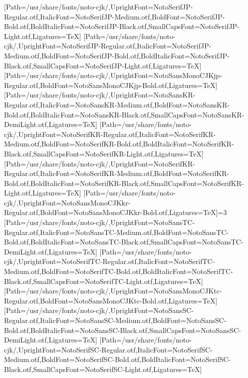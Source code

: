 \newfontfamily{}[Path=/usr/share/fonts/noto-cjk/,UprightFont=NotoSerifJP-Regular.otf,ItalicFont=NotoSerifJP-Medium.otf,BoldFont=NotoSerifJP-Bold.otf,BoldItalicFont=NotoSerifJP-Black.otf,SmallCapsFont=NotoSerifJP-Light.otf,Ligatures=TeX]
\newfontfamily{}[Path=/usr/share/fonts/noto-cjk/,UprightFont=NotoSerifJP-Regular.otf,ItalicFont=NotoSerifJP-Medium.otf,BoldFont=NotoSerifJP-Bold.otf,BoldItalicFont=NotoSerifJP-Black.otf,SmallCapsFont=NotoSerifJP-Light.otf,Ligatures=TeX]
\newfontfamily{}[Path=/usr/share/fonts/noto-cjk/,UprightFont=NotoSansMonoCJKjp-Regular.otf,BoldFont=NotoSansMonoCJKjp-Bold.otf,Ligatures=TeX]
\newfontfamily{}[Path=/usr/share/fonts/noto-cjk/,UprightFont=NotoSansKR-Regular.otf,ItalicFont=NotoSansKR-Medium.otf,BoldFont=NotoSansKR-Bold.otf,BoldItalicFont=NotoSansKR-Black.otf,SmallCapsFont=NotoSansKR-DemiLight.otf,Ligatures=TeX]
\newfontfamily{}[Path=/usr/share/fonts/noto-cjk/,UprightFont=NotoSerifKR-Regular.otf,ItalicFont=NotoSerifKR-Medium.otf,BoldFont=NotoSerifKR-Bold.otf,BoldItalicFont=NotoSerifKR-Black.otf,SmallCapsFont=NotoSerifKR-Light.otf,Ligatures=TeX]
\newfontfamily{}[Path=/usr/share/fonts/noto-cjk/,UprightFont=NotoSerifKR-Regular.otf,ItalicFont=NotoSerifKR-Medium.otf,BoldFont=NotoSerifKR-Bold.otf,BoldItalicFont=NotoSerifKR-Black.otf,SmallCapsFont=NotoSerifKR-Light.otf,Ligatures=TeX]
\newfontfamily{}[Path=/usr/share/fonts/noto-cjk/,UprightFont=NotoSansMonoCJKkr-Regular.otf,BoldFont=NotoSansMonoCJKkr-Bold.otf,Ligatures=TeX]\else\ifnum\value{NotoCJKFamily}=3
\newfontfamily{}[Path=/usr/share/fonts/noto-cjk/,UprightFont=NotoSansTC-Regular.otf,ItalicFont=NotoSansTC-Medium.otf,BoldFont=NotoSansTC-Bold.otf,BoldItalicFont=NotoSansTC-Black.otf,SmallCapsFont=NotoSansTC-DemiLight.otf,Ligatures=TeX]
\newfontfamily{}[Path=/usr/share/fonts/noto-cjk/,UprightFont=NotoSerifTC-Regular.otf,ItalicFont=NotoSerifTC-Medium.otf,BoldFont=NotoSerifTC-Bold.otf,BoldItalicFont=NotoSerifTC-Black.otf,SmallCapsFont=NotoSerifTC-Light.otf,Ligatures=TeX]
\newfontfamily{}[Path=/usr/share/fonts/noto-cjk/,UprightFont=NotoSansMonoCJKtc-Regular.otf,BoldFont=NotoSansMonoCJKtc-Bold.otf,Ligatures=TeX]
\newfontfamily{}[Path=/usr/share/fonts/noto-cjk/,UprightFont=NotoSansSC-Regular.otf,ItalicFont=NotoSansSC-Medium.otf,BoldFont=NotoSansSC-Bold.otf,BoldItalicFont=NotoSansSC-Black.otf,SmallCapsFont=NotoSansSC-DemiLight.otf,Ligatures=TeX]
\newfontfamily{}[Path=/usr/share/fonts/noto-cjk/,UprightFont=NotoSerifSC-Regular.otf,ItalicFont=NotoSerifSC-Medium.otf,BoldFont=NotoSerifSC-Bold.otf,BoldItalicFont=NotoSerifSC-Black.otf,SmallCapsFont=NotoSerifSC-Light.otf,Ligatures=TeX]
